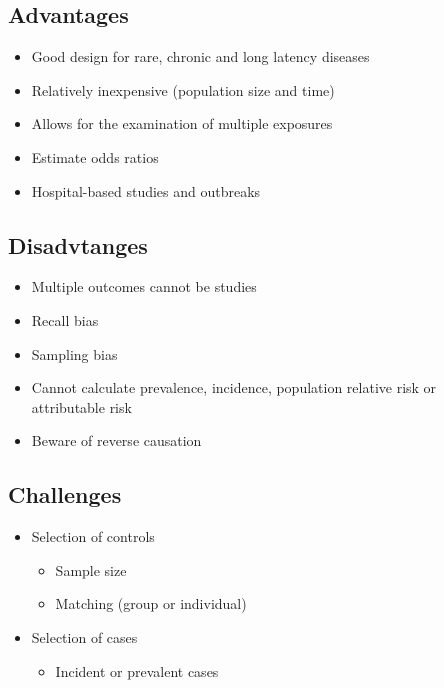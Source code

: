 \documentclass[
]{book}
\providecommand{\tightlist}{%
  \setlength{\itemsep}{0pt}\setlength{\parskip}{0pt}}
\begin{document}
\hypertarget{advantages-1}{%
\subsection{Advantages}\label{advantages-1}}

\begin{itemize}
\tightlist
\item
  Good design for rare, chronic and long latency diseases
\item
  Relatively inexpensive (population size and time)
\item
  Allows for the examination of multiple exposures
\item
  Estimate odds ratios
\item
  Hospital-based studies and outbreaks
\end{itemize}

\hypertarget{disadvtanges}{%
\subsection{Disadvtanges}\label{disadvtanges}}

\begin{itemize}
\tightlist
\item
  Multiple outcomes cannot be studies
\item
  Recall bias
\item
  Sampling bias
\item
  Cannot calculate prevalence, incidence, population relative risk or attributable risk
\item
  Beware of reverse causation
\end{itemize}

\hypertarget{challenges}{%
\subsection{Challenges}\label{challenges}}

\begin{itemize}
\tightlist
\item
  Selection of controls

  \begin{itemize}
  \tightlist
  \item
    Sample size
  \item
    Matching (group or individual)
  \end{itemize}
\item
  Selection of cases

  \begin{itemize}
  \tightlist
  \item
    Incident or prevalent cases
  \end{itemize}
\end{itemize}
\end{document}

